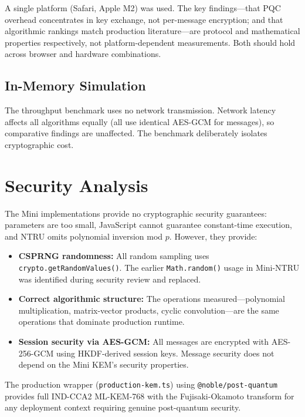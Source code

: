 \documentclass[12pt,a4paper]{report}
\begin{document}
A single platform (Safari, Apple M2) was used. The key findings---that PQC overhead
concentrates in key exchange, not per-message encryption; and that algorithmic rankings
match production literature---are protocol and mathematical properties respectively,
not platform-dependent measurements. Both should hold across browser and hardware
combinations.

\subsection{In-Memory Simulation}

The throughput benchmark uses no network transmission. Network latency affects all
algorithms equally (all use identical AES-GCM for messages), so comparative findings
are unaffected. The benchmark deliberately isolates cryptographic cost.

\section{Security Analysis}

The Mini implementations provide no cryptographic security guarantees:
parameters are too small, JavaScript cannot guarantee constant-time execution,
and NTRU omits polynomial inversion mod $p$. However, they provide:

\begin{itemize}
  \item \textbf{CSPRNG randomness:} All random sampling uses \texttt{crypto.getRandomValues()}.
  The earlier \texttt{Math.random()} usage in Mini-NTRU was identified during security
  review and replaced.

  \item \textbf{Correct algorithmic structure:} The operations measured---polynomial
  multiplication, matrix-vector products, cyclic convolution---are the same operations
  that dominate production runtime.

  \item \textbf{Session security via AES-GCM:} All messages are encrypted with
  AES-256-GCM using HKDF-derived session keys. Message security does not depend on
  the Mini KEM's security properties.
\end{itemize}

The production wrapper (\texttt{production-kem.ts}) using \texttt{@noble/post-quantum}
provides full IND-CCA2 ML-KEM-768 with the Fujisaki-Okamoto transform for any
deployment context requiring genuine post-quantum security.
\end{document}
